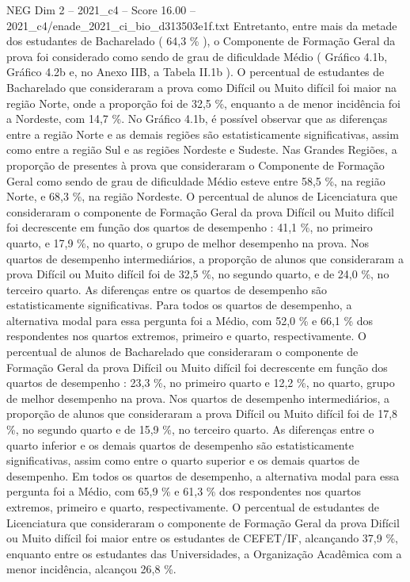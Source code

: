 \begin{textsample}{NEG Dim 2 – 2021\_c4 – Score 16.00 – 2021\_c4/enade\_2021\_ci\_bio\_d313503e1f.txt}
Entretanto, entre mais da metade dos estudantes de Bacharelado ( 64,3 \% ), o Componente de Formação Geral da prova foi considerado como sendo de grau de dificuldade Médio ( Gráfico 4.1b, Gráfico 4.2b e, no Anexo IIB, a Tabela II.1b ).
O percentual de estudantes de Bacharelado que consideraram a prova como Difícil ou Muito difícil foi maior na região Norte, onde a proporção foi de 32,5 \%, enquanto a de menor incidência foi a Nordeste, com 14,7 \%.
No Gráfico 4.1b, é possível observar que as diferenças entre a região Norte e as demais regiões são estatisticamente significativas, assim como entre a região Sul e as regiões Nordeste e Sudeste.
Nas Grandes Regiões, a proporção de presentes à prova que consideraram o Componente de Formação Geral como sendo de grau de dificuldade Médio esteve entre 58,5 \%, na região Norte, e 68,3 \%, na região Nordeste.
O percentual de alunos de Licenciatura que consideraram o componente de Formação Geral da prova Difícil ou Muito difícil foi decrescente em função dos quartos de desempenho : 41,1 \%, no primeiro quarto, e 17,9 \%, no quarto, o grupo de melhor desempenho na prova.
Nos quartos de desempenho intermediários, a proporção de alunos que consideraram a prova Difícil ou Muito difícil foi de 32,5 \%, no segundo quarto, e de 24,0 \%, no terceiro quarto.
As diferenças entre os quartos de desempenho são estatisticamente significativas.
Para todos os quartos de desempenho, a alternativa modal para essa pergunta foi a Médio, com 52,0 \% e 66,1 \% dos respondentes nos quartos extremos, primeiro e quarto, respectivamente.
O percentual de alunos de Bacharelado que consideraram o componente de Formação Geral da prova Difícil ou Muito difícil foi decrescente em função dos quartos de desempenho : 23,3 \%, no primeiro quarto e 12,2 \%, no quarto, grupo de melhor desempenho na prova.
Nos quartos de desempenho intermediários, a proporção de alunos que consideraram a prova Difícil ou Muito difícil foi de 17,8 \%, no segundo quarto e de 15,9 \%, no terceiro quarto.
As diferenças entre o quarto inferior e os demais quartos de desempenho são estatisticamente significativas, assim como entre o quarto superior e os demais quartos de desempenho.
Em todos os quartos de desempenho, a alternativa modal para essa pergunta foi a Médio, com 65,9 \% e 61,3 \% dos respondentes nos quartos extremos, primeiro e quarto, respectivamente.
O percentual de estudantes de Licenciatura que consideraram o componente de Formação Geral da prova Difícil ou Muito difícil foi maior entre os estudantes de CEFET/IF, alcançando 37,9 \%, enquanto entre os estudantes das Universidades, a Organização Acadêmica com a menor incidência, alcançou 26,8 \%.

\end{textsample}
